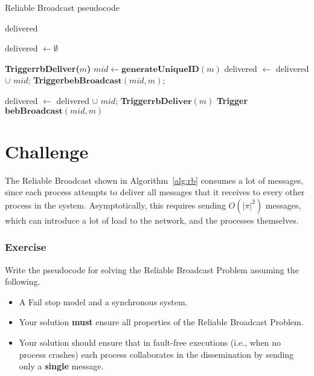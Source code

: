 \documentclass[10pt,a4paper]{article}
\newcommand{\trigger}{\textbf{Trigger}\xspace}
\begin{document}
\begin{algorithm}[h]
	\label{alg:rb}
	\caption{Reliable Broadcast pseudocode}
	\begin{algorithmic}
	\item[]
	\Interface
	\EndInterface
	
	\item[]
	\AlgState
	  \State delivered 
	
		\item[]
      \State delivered $\leftarrow \emptyset$
		\EndUpon
		\item[]
      \State \trigger \textbf{rbDeliver($m$)}
      \State \(mid \leftarrow \textbf{generateUniqueID}(m)\)
      \State delivered \(\leftarrow\) delivered \(\cup\) \(mid\);
      \State \trigger \(\textbf{bebBroadcast}( mid, m  )\);
		\EndUpon
		\item[]
        \State delivered \(\leftarrow\) delivered \(\cup\) \(mid\);
        \State \trigger \(\textbf{rbDeliver}(m)\)
        \State \trigger \(\textbf{bebBroadcast}(mid, m)\)
      \EndIf
		\EndUpon
	\EndAlgState
  \item[]
	\EndProcedure
	\end{algorithmic}
\end{algorithm} 

\newpage

\section{Challenge}
The Reliable Broadcast shown in Algorithm~\ref{alg:rb} consumes a lot of messages, since each process attempts to deliver all messages that it receives to every other process in the system. Asymptotically, this requires sending \(O(|\pi|^2)\) messages, which can introduce a lot of load to the network, and the processes themselves.

\subsubsection*{Exercise}
Write the pseudocode for solving the Reliable Broadcast Problem assuming the following.
\begin{itemize}
  \item A Fail stop model and a synchronous system.
  \item Your solution \textbf{must} ensure all properties of the Reliable Broadcast Problem.
  \item Your solution should ensure that in fault-free executions (i.e., when no process crashes) each process collaborates in the dissemination by sending only a \textbf{single} message.
\end{itemize}
\end{document}
